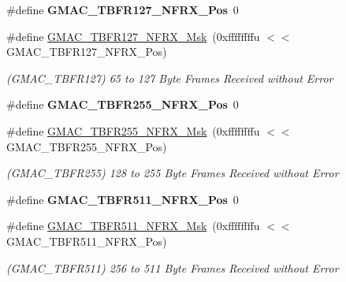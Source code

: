 \begin{DoxyCompactItemize}
\mbox{\label{group__SAME70__GMAC_ga57d22d8b5074b683c214e81ad627b90c}} 
\#define {\bfseries G\+M\+A\+C\+\_\+\+T\+B\+F\+R127\+\_\+\+N\+F\+R\+X\+\_\+\+Pos}~0
\item 
\mbox{\label{group__SAME70__GMAC_ga8b2049b16d4a7e162e20c27c0d621f72}} 
\#define \mbox{\hyperlink{group__SAME70__GMAC_ga8b2049b16d4a7e162e20c27c0d621f72}{G\+M\+A\+C\+\_\+\+T\+B\+F\+R127\+\_\+\+N\+F\+R\+X\+\_\+\+Msk}}~(0xffffffffu $<$$<$ G\+M\+A\+C\+\_\+\+T\+B\+F\+R127\+\_\+\+N\+F\+R\+X\+\_\+\+Pos)
\begin{DoxyCompactList}\small\item\em (G\+M\+A\+C\+\_\+\+T\+B\+F\+R127) 65 to 127 Byte Frames Received without Error \end{DoxyCompactList}\item 
\mbox{\label{group__SAME70__GMAC_ga497d421b619d6fd3e2d3ba40b45c5c44}} 
\#define {\bfseries G\+M\+A\+C\+\_\+\+T\+B\+F\+R255\+\_\+\+N\+F\+R\+X\+\_\+\+Pos}~0
\item 
\mbox{\label{group__SAME70__GMAC_ga36d1c5e15a4b57579b25cd21928e2992}} 
\#define \mbox{\hyperlink{group__SAME70__GMAC_ga36d1c5e15a4b57579b25cd21928e2992}{G\+M\+A\+C\+\_\+\+T\+B\+F\+R255\+\_\+\+N\+F\+R\+X\+\_\+\+Msk}}~(0xffffffffu $<$$<$ G\+M\+A\+C\+\_\+\+T\+B\+F\+R255\+\_\+\+N\+F\+R\+X\+\_\+\+Pos)
\begin{DoxyCompactList}\small\item\em (G\+M\+A\+C\+\_\+\+T\+B\+F\+R255) 128 to 255 Byte Frames Received without Error \end{DoxyCompactList}\item 
\mbox{\label{group__SAME70__GMAC_gad904c2e14365399a71caf3c143cd3065}} 
\#define {\bfseries G\+M\+A\+C\+\_\+\+T\+B\+F\+R511\+\_\+\+N\+F\+R\+X\+\_\+\+Pos}~0
\item 
\mbox{\label{group__SAME70__GMAC_ga85625a6a826669a3515f9e73e8c41c8a}} 
\#define \mbox{\hyperlink{group__SAME70__GMAC_ga85625a6a826669a3515f9e73e8c41c8a}{G\+M\+A\+C\+\_\+\+T\+B\+F\+R511\+\_\+\+N\+F\+R\+X\+\_\+\+Msk}}~(0xffffffffu $<$$<$ G\+M\+A\+C\+\_\+\+T\+B\+F\+R511\+\_\+\+N\+F\+R\+X\+\_\+\+Pos)
\begin{DoxyCompactList}\small\item\em (G\+M\+A\+C\+\_\+\+T\+B\+F\+R511) 256 to 511 Byte Frames Received without Error \end{DoxyCompactList}\item 
$$
\end{DoxyCompactItemize}
